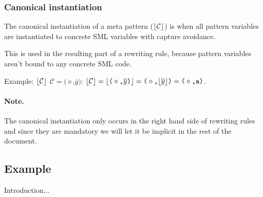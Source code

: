 \subsubsection{Canonical instantiation}
The canonical instantiation of a meta pattern ($\lfloor \mathcal{C} \rfloor$) is when
all pattern variables are instantiated to concrete SML variables with capture
avoidance. 


This is used in the resulting part of a rewriting rule, because pattern
variables aren't bound to any concrete SML code.

Example: $\lfloor \mathcal{C} \rfloor$ $\mathcal{C} = \texttt{(}\diamond\texttt{,} \overline{y}\texttt{)}$:
$\lfloor \mathcal{C} \rfloor = \lfloor \texttt{(}\diamond\texttt{,} \overline{y}\texttt{)} \rfloor = \texttt{(}\diamond\texttt{,}
\lfloor \overline{y} \rfloor\texttt{)} = \texttt{(}\diamond\texttt{,} \texttt{a)}$.

\paragraph{Note.} The canonical instantiation only occurs in the right hand side
of rewriting rules and since they are mandatory we will let it be implicit in the
rest of the document.

\subsection{Example}

Introduction...

